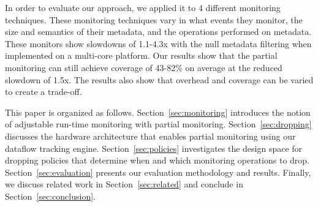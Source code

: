 
In order to evaluate our approach, we applied it to 4 different monitoring
techniques. These monitoring techniques vary in what events they monitor, the
size and semantics of their metadata, and the operations performed on metadata.
These monitors show slowdowns of 1.1-4.3x with the null metadata filtering when
implemented on a multi-core platform.
Our results show that the partial monitoring can still achieve coverage of 43-82\%
on average at the reduced slowdown of 1.5x. 
The results also show that overhead and coverage can be varied to create a trade-off.

This paper is organized as follows. Section~\ref{sec:monitoring} introduces the notion
of adjustable run-time monitoring with partial monitoring.
Section~\ref{sec:dropping} discusses the hardware architecture that enables 
partial monitoring using our dataflow tracking engine.
Section~\ref{sec:policies}
investigates the design space for dropping policies that determine when and which
monitoring operations to drop.
Section~\ref{sec:evaluation} presents our evaluation methodology and
results. Finally, we discuss related work in Section~\ref{sec:related} and
conclude in Section~\ref{sec:conclusion}.

